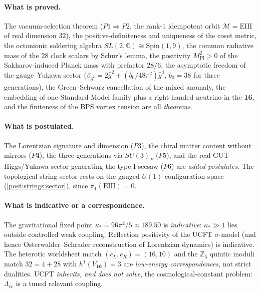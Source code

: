\documentclass[11pt]{article}
\theoremstyle{plain}
\theoremstyle{definition}
\theoremstyle{remark}
\begin{document}
\paragraph{What is proved.}
The vacuum-selection theorem ($P1\Rightarrow P2$, the rank-$1$
idempotent orbit $\mathcal{M}=\mathrm{EIII}$ of real dimension $32$), the
positive-definiteness and uniqueness of the coset metric, the octonionic
soldering algebra $SL(2,\mathbb{O})\cong\mathrm{Spin}(1,9)$, the common
radiative mass of the $28$ clock scalars by Schur's lemma, the positivity
$M_{\mathrm{Pl}}^{2}>0$ of the Sakharov-induced Planck mass with
prefactor $28/6$, the asymptotic freedom of the gauge--Yukawa sector
($\beta_{\hat g^{2}}=2\hat g^{2}+(b_{0}/48\pi^{2})\hat g^{4}$,
$b_{0}=38$ for three generations), the Green--Schwarz cancellation of the
mixed anomaly, the embedding of one Standard-Model family plus a
right-handed neutrino in the $\mathbf{16}$, and the finiteness of the BPS
vortex tension are all \emph{theorems}.

\paragraph{What is postulated.}
The Lorentzian signature and dimension ($P3$), the chiral matter content
without mirrors ($P4$), the three generations via $SU(3)_{F}$ ($P5$), and
the real GUT-Higgs/Yukawa sector generating the type-I seesaw ($P6$) are
\emph{added postulates}. The topological string sector rests on the
gauged-$U(1)$ configuration space (\autoref{post:strings:sector}), since
$\pi_{1}(\mathrm{EIII})=0$.

\paragraph{What is indicative or a correspondence.}
The gravitational fixed point $\kappa_{\ast}=96\pi^{2}/5\approx189.50$ is
\emph{indicative}: $\kappa_{\ast}\gg1$ lies outside controlled weak
coupling. Reflection positivity of the UCFT $\sigma$-model (and hence
Osterwalder--Schrader reconstruction of Lorentzian dynamics) is
indicative. The heterotic worldsheet match $(c_{L},c_{R})=(16,10)$ and
the $\mathbb{Z}_{5}$ quintic moduli match $32=4+28$ with
$h^{1}(V_{\mathbf{16}})=3$ are \emph{low-energy correspondences}, not
strict dualities. UCFT \emph{inherits, and does not solve}, the
cosmological-constant problem: $\Lambda_{cc}$ is a tuned relevant
coupling.
\end{document}

